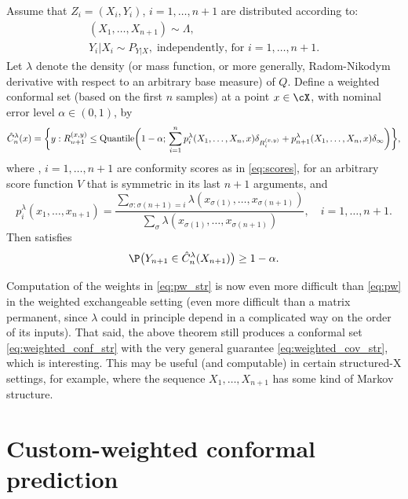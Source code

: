 \documentclass{article}
\begin{document}
\begin{theorem}
\label{thm:weighted_conf_str}
Assume that $Z_i=(X_i,Y_i)$, $i=1,\dots,n+1$ are distributed according to:
\begin{gather*}
(X_1,\dots,X_{n+1}) \sim \Lambda, \\
Y_i|X_i \sim P_{Y|X}, \; \text{independently, for $i=1,\dots,n+1$}.
\end{gather*}
Let $\lambda$ denote the density (or mass function, or more generally,
Radom-Nikodym derivative with respect to an arbitrary base measure) of
$Q$. Define a weighted conformal set (based on the first $n$ samples) at a point
$x \in \cX$, with nominal error level $\alpha \in (0,1)$, by   
\begin{equation}
\label{eq:weighted_conf_str}
\hat{C}^\lambda_n(x) = \bigg\{ y : R_{n+1}^{(x,y)} \leq \mathrm{Quantile}\bigg( 1-\alpha;  
\, \sum_{i=1}^n p^\lambda_i(X_1,\dots,X_n,x) \delta_{R_i^{(x,y)}} +
p^\lambda_{n+1}(X_1,\dots,X_n,x) \delta_\infty \bigg) \bigg\},   
\end{equation}
where , $i=1,\ldots,n+1$ are conformity scores as in
\eqref{eq:scores}, for an arbitrary score function $V$ that is symmetric in its 
last $n+1$ arguments, and
\begin{equation}
\label{eq:pw_str}
p^\lambda_i(x_1,\dots,x_{n+1}) = 
\frac{\sum_{\sigma : \sigma(n+1)=i} \lambda(x_{\sigma(1)},\dots,
  x_{\sigma(n+1)})} {\sum_\sigma \lambda(x_{\sigma(1)},\dots, x_{\sigma(n+1)})},
\quad i=1,\dots,n+1.  
\end{equation}
Then  satisfies 
\begin{equation}
\label{eq:weighted_cov_str}
\P\big( Y_{n+1} \in \hC^\lambda_n(X_{n+1}) \big) \geq 1-\alpha. 
\end{equation}
\end{theorem}

Computation of the weights in \eqref{eq:pw_str} is now even more difficult than
\eqref{eq:pw} in the weighted exchangeable setting (even more difficult than a
matrix permanent, since $\lambda$ could in principle depend in a complicated way
on the order of its inputs). That said, the above theorem still produces a
conformal set \eqref{eq:weighted_conf_str} with the very general guarantee
\eqref{eq:weighted_cov_str}, which is interesting. This may be useful (and
computable) in certain structured-X settings, for example, where the sequence
$X_1,\dots,X_{n+1}$ has some kind of Markov structure.

\section{Custom-weighted conformal prediction}
\end{document}
